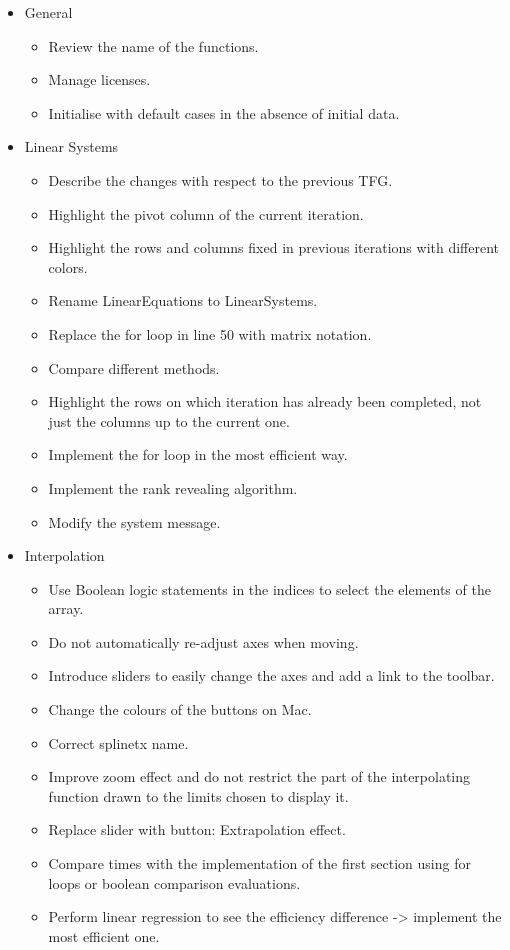 \begin{itemize}
\item General
\begin{itemize}
\item Review the name of the functions.
\item Manage licenses.
\item Initialise with default cases in the absence of initial data.
\end{itemize}
\item Linear Systems
\begin{itemize}
    \item Describe the changes with respect to the previous TFG.
    \item Highlight the pivot column of the current iteration.
    \item Highlight the rows and columns fixed in previous iterations with different colors.
    \item Rename LinearEquations to LinearSystems.
    \item Replace the for loop in line 50 with matrix notation.
    \item Compare different methods.
    \item Highlight the rows on which iteration has already been completed, not just the columns up to the current one.
    \item Implement the for loop in the most efficient way.
    \item Implement the rank revealing algorithm.
    \item Modify the system message.
\end{itemize}

\item Interpolation
\begin{itemize}
    \item Use Boolean logic statements in the indices to select the elements of the array.
    \item Do not automatically re-adjust axes when moving.
    \item Introduce sliders to easily change the axes and add a link to the toolbar.
    \item Change the colours of the buttons on Mac.
    \item Correct splinetx name.
    \item Improve zoom effect and do not restrict the part of the interpolating function drawn to the limits chosen to display it.
    \item Replace slider with button: Extrapolation effect.
    \item Compare times with the implementation of the first section using for loops or boolean comparison evaluations.
    \item Perform linear regression to see the efficiency difference -> implement the most efficient one.
\end{itemize}


\end{itemize}
